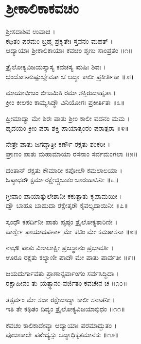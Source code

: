 
\section{ಶ್ರೀಕಾಲಿಕಾಕವಚಂ}
ಶ್ರೀಸದಾಶಿವ ಉವಾಚ ।\\
ಕಥಿತಂ ಪರಮಂ ಬ್ರಹ್ಮ ಪ್ರಕೃತೇಃ ಸ್ತವನಂ ಮಹತ್ ।\\
ಆದ್ಯಾಯಾಃ ಶ್ರೀಕಾಲಿಕಾಯಾಃ ಕವಚಂ ಶೃಣು ಸಾಂಪ್ರತಂ ॥೧॥

ತ್ರೈಲೋಕ್ಯವಿಜಯಸ್ಯಾಸ್ಯ ಕವಚಸ್ಯ ಋಷಿಃ ಶಿವಃ ।\\
ಛಂದೋಽನುಷ್ಟುಬ್ದೇವತಾ ಚ ಆದ್ಯಾ ಕಾಲೀ ಪ್ರಕೀರ್ತಿತಾ ॥೨॥

ಮಾಯಾಬೀಜಂ ಬೀಜಮಿತಿ ರಮಾ ಶಕ್ತಿರುದಾಹೃತಾ ।\\
ಕ್ರೀಂ ಕೀಲಕಂ ಕಾಮ್ಯಸಿದ್ಧೌ ವಿನಿಯೋಗಃ ಪ್ರಕೀರ್ತಿತಃ ॥೩॥

ಹ್ರೀಮಾದ್ಯಾ ಮೇ ಶಿರಃ ಪಾತು ಶ್ರೀಂ ಕಾಲೀ ವದನಂ ಮಮ ।\\
ಹೃದಯಂ ಕ್ರೀಂ ಪರಾ ಶಕ್ತಿ ಪಾಯಾತ್ಕಂಠಂ ಪರಾತ್ಪರಾ ॥೪॥

ನೇತ್ರೇ ಪಾತು ಜಗದ್ಧಾತ್ರೀ ಕರ್ಣೌ ರಕ್ಷತು ಶಂಕರೀ ।\\
ಘ್ರಾಣಂ ಪಾತು ಮಹಾಮಾಯಾ ರಸನಾಂ ಸರ್ವಮಂಗಲಾ ॥೫॥

ದಂತಾನ್ ರಕ್ಷತು ಕೌಮಾರೀ ಕಪೋಲೌ ಕಮಲಾಲಯಾ ।\\
ಓಷ್ಠಾಧರೌ ಕ್ಷಮಾ ರಕ್ಷೇಚ್ಚಿಬುಕಂ ಚಾರುಹಾಸಿನೀ ॥೬॥

ಗ್ರೀವಾಂ ಪಾಯಾತ್ಕುಲೇಶಾನೀ ಕಕುತ್ಪಾತು ಕೃಪಾಮಯೀ ।\\
ದ್ವೌ ಬಾಹೂ ಬಾಹುದಾ ರಕ್ಷೇತ್ಕರೌ ಕೈವಲ್ಯದಾಯಿನೀ ॥೭॥

ಸ್ಕಂಧೌ ಕಪರ್ದಿನೀ ಪಾತು ಪೃಷ್ಠಂ ತ್ರೈಲೋಕ್ಯತಾರಿಣೀ ।\\
ಪಾರ್ಶ್ವೇ ಪಾಯಾದಪರ್ಣಾ ಮೇ ಕಟಿಂ ಮೇ ಕಮಠಾಸನಾ ॥೮॥

ನಾಭೌ ಪಾತು ವಿಶಾಲಾಕ್ಷೀ ಪ್ರಜಸ್ಥಾನಂ ಪ್ರಭಾವತೀ ।\\
ಊರೂ ರಕ್ಷತು ಕಲ್ಯಾಣೀ ಪಾದೌ ಮೇ ಪಾತು ಪಾರ್ವತೀ ॥೯॥

ಜಯದುರ್ಗಾವತು ಪ್ರಾಣಾನ್ಸರ್ವಾಂಗಂ ಸರ್ವಸಿದ್ಧಿದಾ ।\\
ರಕ್ಷಾಹೀನಂ ತು ಯತ್ಸ್ಥಾನಂ ವರ್ಜಿತಂ ಕವಚೇನ ಚ ॥೧೦॥

ತತ್ಸರ್ವಂ ಮೇ ಸದಾ ರಕ್ಷೇದಾದ್ಯಾ ಕಾಲೀ ಸನಾತನೀ ।\\
ಇತಿ ತೇ ಕಥಿತಂ ದಿವ್ಯಂ ತ್ರೈಲೋಕ್ಯವಿಜಯಾಭಿಧಂ ॥೧೧॥

ಕವಚಂ ಕಾಲಿಕಾದೇವ್ಯಾ ಆದ್ಯಾಯಾಃ ಪರಮಾದ್ಭುತಂ ।\\
ಪೂಜಾಕಾಲೇ ಪಠೇದ್ಯಸ್ತು ಆದ್ಯಾಧಿಕೃತಮಾನಸಃ ॥೧೨॥

